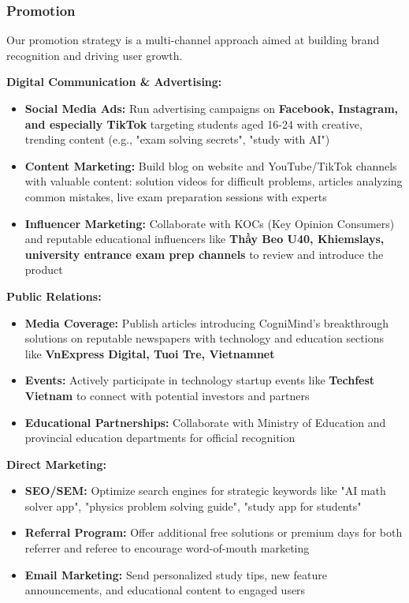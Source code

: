 \subsubsection{Promotion}
Our promotion strategy is a multi-channel approach aimed at building brand recognition and driving user growth.

\textbf{Digital Communication \& Advertising:}
\begin{itemize}
    \item \textbf{Social Media Ads:} Run advertising campaigns on \textbf{Facebook, Instagram, and especially TikTok} targeting students aged 16-24 with creative, trending content (e.g., "exam solving secrets", "study with AI")
    \item \textbf{Content Marketing:} Build blog on website and YouTube/TikTok channels with valuable content: solution videos for difficult problems, articles analyzing common mistakes, live exam preparation sessions with experts
    \item \textbf{Influencer Marketing:} Collaborate with KOCs (Key Opinion Consumers) and reputable educational influencers like \textbf{Thầy Beo U40, Khiemslays, university entrance exam prep channels} to review and introduce the product
\end{itemize}

\textbf{Public Relations:}
\begin{itemize}
    \item \textbf{Media Coverage:} Publish articles introducing CogniMind's breakthrough solutions on reputable newspapers with technology and education sections like \textbf{VnExpress Digital, Tuoi Tre, Vietnamnet}
    \item \textbf{Events:} Actively participate in technology startup events like \textbf{Techfest Vietnam} to connect with potential investors and partners
    \item \textbf{Educational Partnerships:} Collaborate with Ministry of Education and provincial education departments for official recognition
\end{itemize}

\textbf{Direct Marketing:}
\begin{itemize}
    \item \textbf{SEO/SEM:} Optimize search engines for strategic keywords like "AI math solver app", "physics problem solving guide", "study app for students"
    \item \textbf{Referral Program:} Offer additional free solutions or premium days for both referrer and referee to encourage word-of-mouth marketing
    \item \textbf{Email Marketing:} Send personalized study tips, new feature announcements, and educational content to engaged users
\end{itemize}

